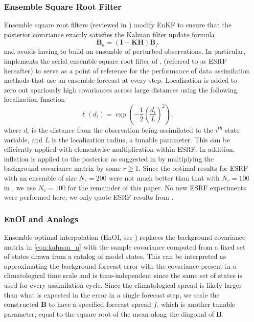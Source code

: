 \documentclass[final,3p]{elsarticle}
\theoremstyle{break}
\newcommand{\bb}[1]{\mathbf{#1}}
\begin{document}
\subsubsection{Ensemble Square Root Filter}\label{methods:ESRF}
Ensemble square root filters (reviewed in \cite{tippett2003ensemble}) modify EnKF to ensure that the posterior covariance exactly satisfies the Kalman filter update formula
\begin{equation}
    \bb{B}_a = \left(\bb{I} - \bb{KH}\right)\bb{B}_f
\end{equation}
and avoids having to build an ensemble of perturbed observations. 
In particular, \cite{grooms2020analog} implements the serial ensemble square root filter of \cite{whitaker2002ensemble}, (referred to as ESRF hereafter) to serve as a point of reference for the performance of data assimilation methods that use an ensemble forecast at every step.
Localization is added to zero out spuriously high covariances across large distances using the following localization function
\begin{equation}\label{eqn:loc}
	\ell(d_i) = \exp\left(-\frac{1}{2}\left(\frac{d_i}{L}\right)^2\right),
\end{equation}
where $d_i$ is the distance from the observation being assimilated to the $i^{th}$ state variable, and $L$ is the localization radius, a tunable parameter.
This can be efficiently applied with elementwise multiplication within ESRF.
In addition, inflation is applied to the posterior as suggested in \cite{el2019comparing} by multiplying the background covariance matrix by some $r\geq 1$. 
Since the optimal results for ESRF with an ensemble of size $N_e=200$ were not much better than that with $N_e=100$ in \cite{grooms2020analog}, we use $N_e=100$ for the remainder of this paper.
No new ESRF experiments were performed here; we only quote ESRF results from \cite{grooms2020analog}.

\subsubsection{EnOI and Analogs}\label{methods:EnOI}
Ensemble optimal interpolation (EnOI, see \cite{Oke2002,Evensen2003}) replaces the background covariance matrix in \cref{eqn:kalman_u} with the sample covariance computed from a fixed set of states drawn from a catalog of model states.
This can be interpreted as approximating the background forecast error with the covariance present in a climatological time scale and is time-independent since the same set of states is used for every assimilation cycle.
Since the climatological spread is likely larger than what is expected in the error in a single forecast step, we scale the constructed $\bb{B}$ to have a specified forecast spread $f$, which is another tunable parameter, equal to the square root of the mean along the diagonal of $\bb{B}$. \par
\end{document}
